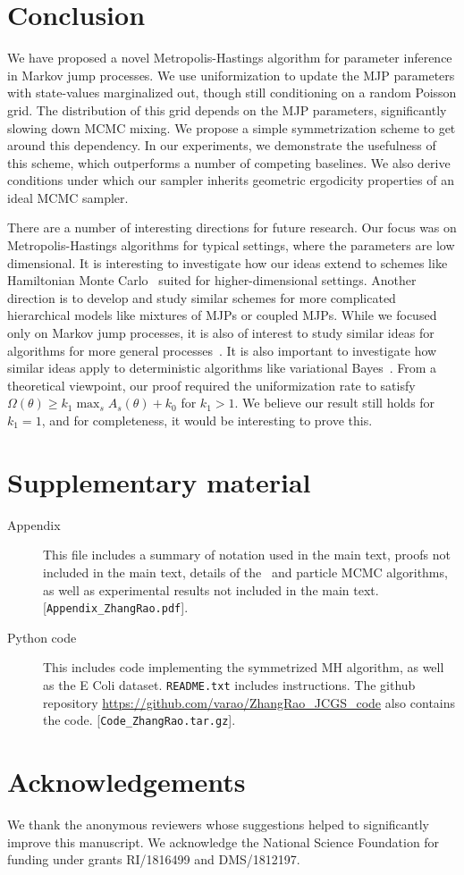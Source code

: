 \section{Conclusion}
We have proposed a novel Metropolis-Hastings algorithm for parameter 
inference in Markov jump processes. We use 
uniformization to update the MJP parameters with state-values marginalized 
out, though still conditioning on a random Poisson grid. The 
distribution of this grid depends on the MJP parameters, significantly 
slowing down MCMC mixing. We propose a simple symmetrization scheme to get 
around this dependency. In our experiments, we demonstrate the usefulness 
of this scheme, which outperforms a number of competing baselines.
We also derive conditions under which our sampler inherits geometric 
ergodicity properties of an ideal MCMC sampler.


There are a number of interesting directions for future research.
Our focus was on Metropolis-Hastings algorithms for typical settings,
where the parameters are low dimensional. It is interesting to 
investigate how our ideas extend to schemes like Hamiltonian Monte 
Carlo~\citep{Neal2010} suited for higher-dimensional settings. Another 
direction is to develop and study similar schemes for more complicated 
hierarchical models like mixtures of MJPs or coupled MJPs. While we 
focused only on Markov jump processes, it is also of interest to study 
similar ideas for algorithms for more general processes~\citep{RaoTeh12}. 
It is also important to investigate how similar ideas apply to 
deterministic algorithms like variational Bayes~\citep{OpperVarinf, panzharao17}. From 
a theoretical viewpoint, our proof required the uniformization rate to 
satisfy $\Omega(\theta) \ge k_1 \max_s A_s(\theta) + k_0$ for $k_1 > 1$. 
We believe our result still holds for $k_1 = 1$, and for completeness, 
it would be interesting to prove this.  


\section{Supplementary material}
\begin{description}
  \item[Appendix] This file includes a summary of notation used in the main text, proofs not included in the main text, details of the \naive\ and particle MCMC algorithms, as well as experimental results not included in the main text. [\texttt{Appendix\_ZhangRao.pdf}]. 
\item[Python code] This includes code implementing the symmetrized MH algorithm, as well as the E Coli dataset.
  {\texttt{README.txt}} includes instructions. The github repository {\url{https://github.com/varao/ZhangRao_JCGS_code}} also contains the code.
 [\texttt{Code\_ZhangRao.tar.gz}].
\end{description}

\section{Acknowledgements}
We thank the anonymous reviewers whose suggestions helped to significantly improve this manuscript.
We acknowledge the National Science Foundation for funding under grants RI/1816499 and DMS/1812197.


